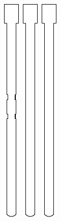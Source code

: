 \documentclass[openany]{book}
\begin{document}
\begin{figure}[!ht]
\begin{subfigure}{.4\textwidth}
		\includegraphics[width=.05\textwidth]{images/transmission-result-9.pdf}\,
		\includegraphics[width=.05\textwidth]{images/transmission-shaft.pdf}\,
		\includegraphics[width=.05\textwidth]{images/transmission-shaft.pdf}\,

\end{subfigure}
\end{figure}
\end{document}
